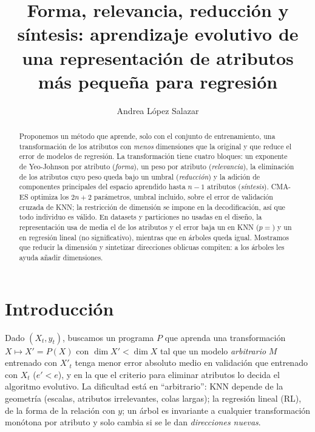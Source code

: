 \documentclass[runningheads]{llncs}
\begin{document}
\title{Forma, relevancia, reducción y síntesis: aprendizaje evolutivo de una representación de atributos más
pequeña para regresión}
\author{Andrea López Salazar}
\maketitle

\begin{abstract}
Proponemos un método que aprende, solo con el conjunto de entrenamiento, una transformación de los atributos con
\emph{menos} dimensiones que la original y que reduce el error de modelos de regresión. La transformación tiene
cuatro bloques: un exponente de Yeo-Johnson por atributo (\emph{forma}), un peso por atributo (\emph{relevancia}),
la eliminación de los atributos cuyo peso queda bajo un umbral (\emph{reducción}) y la adición de componentes
principales del espacio aprendido hasta $n-1$ atributos (\emph{síntesis}). CMA-ES optimiza los $2n+2$ parámetros,
umbral incluido, sobre el error de validación cruzada de KNN; la restricción de dimensión se impone en la
decodificación, así que todo individuo es válido. En \nDatasets{} datasets y \nParticiones{} particiones no usadas
en el diseño, la representación usa de media el \dimMedia{} de los atributos y el error baja un \cambioKNN{} en KNN
($p=$\pKNN) y un \cambioRL{} en regresión lineal (no significativo), mientras que en árboles queda igual. Mostramos
que reducir la dimensión y sintetizar direcciones oblicuas compiten: a los árboles les ayuda añadir dimensiones.
\end{abstract}

\section{Introducción}
Dado $(X_t,y_t)$, buscamos un programa $P$ que aprenda una transformación $X\mapsto X'=P(X)$ con
$\dim X'<\dim X$ tal que un modelo \emph{arbitrario} $M$ entrenado con $X'_t$ tenga menor error absoluto medio en
validación que entrenado con $X_t$ ($e'<e$), y en la que el criterio para eliminar atributos lo decida el algoritmo
evolutivo. La dificultad está en ``arbitrario'': KNN depende de la geometría (escalas, atributos irrelevantes, colas
largas); la regresión lineal (RL), de la forma de la relación con $y$; un árbol es invariante a cualquier
transformación monótona por atributo y solo cambia si se le dan \emph{direcciones nuevas}.
\end{document}
